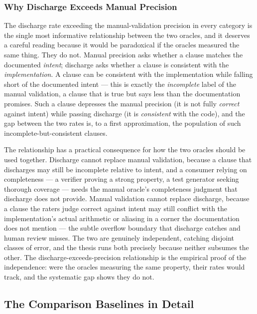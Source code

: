 \subsubsection{Why Discharge Exceeds Manual Precision}

The discharge rate exceeding the manual-validation precision in every category is
the single most informative relationship between the two oracles, and it deserves
a careful reading because it would be paradoxical if the oracles measured the same
thing. They do not. Manual precision asks whether a clause matches the documented
\emph{intent}; discharge asks whether a clause is consistent with the
\emph{implementation}. A clause can be consistent with the implementation while
falling short of the documented intent --- this is exactly the
\emph{incomplete} label of the manual validation, a clause that is true but says
less than the documentation promises. Such a clause depresses the manual precision
(it is not fully \emph{correct} against intent) while passing discharge (it is
\emph{consistent} with the code), and the gap between the two rates is, to a first
approximation, the population of such incomplete-but-consistent clauses.

The relationship has a practical consequence for how the two oracles should be used
together. Discharge cannot replace manual validation, because a clause that
discharges may still be incomplete relative to intent, and a consumer relying on
completeness --- a verifier proving a strong property, a test generator seeking
thorough coverage --- needs the manual oracle's completeness judgment that
discharge does not provide. Manual validation cannot replace discharge, because a
clause the raters judge correct against intent may still conflict with the
implementation's actual arithmetic or aliasing in a corner the documentation does
not mention --- the subtle overflow boundary that discharge catches and human
review misses. The two are genuinely independent, catching disjoint classes of
error, and the thesis runs both precisely because neither subsumes the other. The
discharge-exceeds-precision relationship is the empirical proof of the independence:
were the oracles measuring the same property, their rates would track, and the
systematic gap shows they do not.

\subsection{The Comparison Baselines in Detail}

